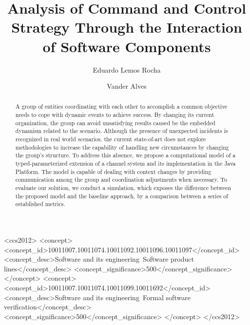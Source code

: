 \documentclass[acmsmall,colorlinks, dvipsnames]{acmart}
\begin{document}
 



\title{Analysis of Command and Control Strategy Through the Interaction of Software Components}

    

\author{Eduardo Lemos Rocha}

\author{Vander Alves}


\begin{abstract}

A group of entities coordinating with each other to accomplish a common objective needs to cope with dynamic events to achieve success. By changing its current organization, the group can avoid unsatisfying results caused be the embedded dynamism related to the scenario. Although the presence of unexpected incidents is recognized in real world scenarios, the current state-of-art does not explore methodologies to increase the capability of handling new circumstances by changing the group's structure. To address this absence, we propose a computational model of a typed-parameterized extension of a channel system and its implementation in the Java Platform. The model is capable of dealing with context changes by providing communication among the group and coordination adjustments when necessary. To evaluate our solution, we conduct a simulation, which exposes the difference between the proposed model and the baseline approach, by a comparison between a series of established metrics.

\end{abstract}

\begin{CCSXML}
<ccs2012>
   <concept>
       <concept_id>10011007.10011074.10011092.10011096.10011097</concept_id>
       <concept_desc>Software and its engineering~Software product lines</concept_desc>
       <concept_significance>500</concept_significance>
       </concept>
   <concept>
       <concept_id>10011007.10011074.10011099.10011692</concept_id>
       <concept_desc>Software and its engineering~Formal software verification</concept_desc>
       <concept_significance>500</concept_significance>
       </concept>
 </ccs2012>
\end{CCSXML}
\end{document}
